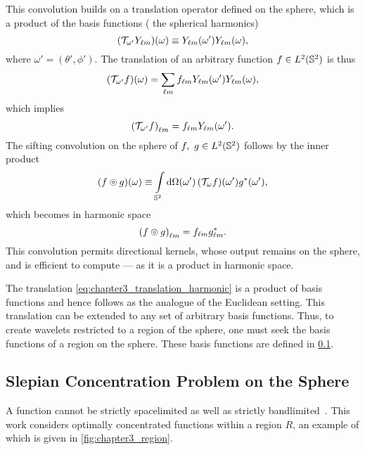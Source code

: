 This convolution builds on a translation operator defined on the sphere, which is a product of the basis functions (\ie{} the spherical harmonics)
%
\begin{equation}\label{eq:chapter3_translation_harmonic}
	\pixel{(\translation{\omega'}\harmonic{Y})}
	\equiv \pixel[']{\harmonic{Y}} \pixel{\harmonic{Y}},
\end{equation}
%
where \(\omega'=(\theta',\phi')\).
The translation of an arbitrary function \(f \in \hilbert{\twoSphere}\) is thus
%
\begin{equation}
	\pixel{(\translation{\omega'}f)} = \harmonicSum \harmonic{f} \pixel[']{\harmonic{Y}} \pixel{\harmonic{Y}},
\end{equation}
%
which implies
%
\begin{equation}
	\harmonic{(\translation{\omega'}f)} = \harmonic{f} \pixel[']{\harmonic{Y}}.
\end{equation}
%
The sifting convolution on the sphere of \(f,\ g \in \hilbert{\twoSphere}\) follows by the inner product
%
\begin{equation}\label{eq:chapter3_sifting_convolution}
	\pixel{\convolution{f}{g}}
	\equiv \integrateSphere{\omega'} \pixel[']{(\translation{\omega}f)} \pixel[']{\conj{g}},
\end{equation}
%
which becomes in harmonic space
%
\begin{equation}
	\harmonic{\convolution{f}{g}}
	= \harmonic{f} \conj{\harmonic{g}}.
\end{equation}
%
This convolution permits directional kernels, whose output remains on the sphere, and is efficient to compute --- as it is a product in harmonic space.

The translation \cref{eq:chapter3_translation_harmonic} is a product of basis functions and hence follows as the analogue of the Euclidean setting.
This translation can be extended to any set of arbitrary basis functions.
Thus, to create wavelets restricted to a region of the sphere, one must seek the basis functions of a region on the sphere.
These basis functions are defined in \cref{sec:chapter3_slepian_concentration_problem}.

\subsection{Slepian Concentration Problem on the Sphere}\label{sec:chapter3_slepian_concentration_problem}

A function cannot be strictly spacelimited as well as strictly bandlimited~\cite{Slepian1961,Slepian1983}.
This work considers optimally concentrated functions within a region \(R\), an example of which is given in \cref{fig:chapter3_region}.


